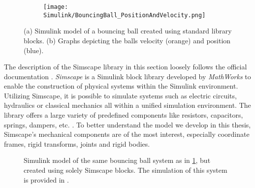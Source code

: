 \begin{figure}[h!]
	\begin{subfigure}{.5\textwidth} %
		\centering
		\caption{}
		\label{figure: Simulink bouncing ball model}
	\end{subfigure}
	\begin{subfigure}{.5\textwidth}
		\centering
		\texttt{[image: Simulink/BouncingBall\_PositionAndVelocity.png]}  
		\caption{}
		\label{figure: Simulink bouncing ball graphs}
	\end{subfigure}
	\caption[Simulink bouncing ball example]{(a) Simulink model of a bouncing ball created using standard library blocks. (b) Graphs depicting the balls velocity (orange) and position (blue).}
	\label{figure: Simulink bouncing ball example}
\end{figure}


The description of the Simscape library in this section loosely follows the official documentation \parencite{matlabSimscapeDocumentation}.
\textit{Simscape\textsuperscript{\texttrademark}} is a Simulink block library developed by \textit{MathWorks\textsuperscript{\textregistered}} to enable the construction of physical systems within the Simulink environment.
Utilizing Simscape, it is possible to simulate systems such as electric circuits, hydraulics or classical mechanics all within a unified simulation environment.
The library offers a large variety of predefined components like resistors, capacitors, springs, dampers, etc. \parencite{matlabSimscapeDocumentation}.
To better understand the model we develop in this thesis, Simscape's mechanical components are of the most interest, especially coordinate frames, rigid transforms, joints and rigid bodies.

\begin{figure}[h!]
	\centering
	\centerline{}
	\caption[Simscape bouncing ball example]{Simulink model of the same bouncing ball system as in \ref{figure: Simulink bouncing ball model}, but created using solely Simscape blocks. The simulation of this system is provided in \cite{VIDEO1}.} 
	\label{figure: Simscape Bouncing Ball Example}
\end{figure}

